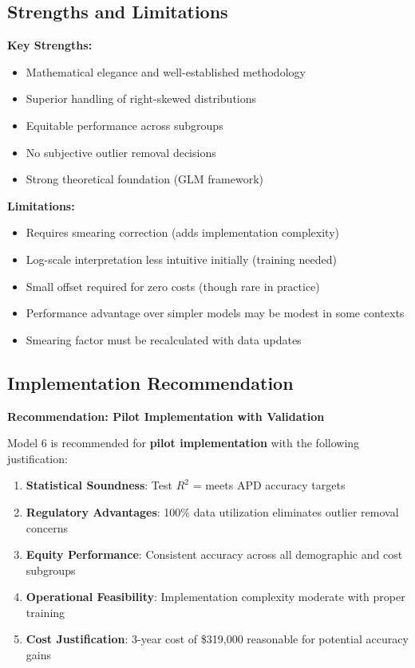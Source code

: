 \subsection{Strengths and Limitations}

\textbf{Key Strengths:}
\begin{itemize}
    \item Mathematical elegance and well-established methodology
    \item Superior handling of right-skewed distributions
    \item Equitable performance across subgroups
    \item No subjective outlier removal decisions
    \item Strong theoretical foundation (GLM framework)
\end{itemize}

\textbf{Limitations:}
\begin{itemize}
    \item Requires smearing correction (adds implementation complexity)
    \item Log-scale interpretation less intuitive initially (training needed)
    \item Small offset required for zero costs (though rare in practice)
    \item Performance advantage over simpler models may be modest in some contexts
    \item Smearing factor must be recalculated with data updates
\end{itemize}

\subsection{Implementation Recommendation}

\textbf{Recommendation: Pilot Implementation with Validation}

Model 6 is recommended for \textbf{pilot implementation} with the following justification:

\begin{enumerate}
    \item \textbf{Statistical Soundness}: Test $R^2$ = \ModelSixRSquaredTest{} meets APD accuracy targets
    
    \item \textbf{Regulatory Advantages}: 100\% data utilization eliminates outlier removal concerns
    
    \item \textbf{Equity Performance}: Consistent accuracy across all demographic and cost subgroups
    
    \item \textbf{Operational Feasibility}: Implementation complexity moderate with proper training
    
    \item \textbf{Cost Justification}: 3-year cost of \$319,000 reasonable for potential accuracy gains
\end{enumerate}

